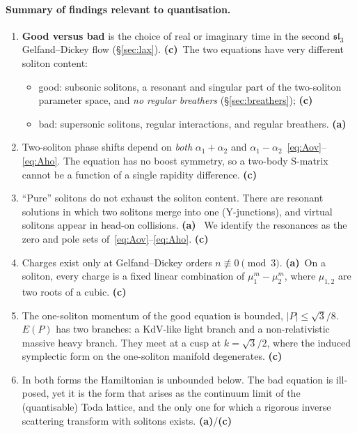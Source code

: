 \documentclass[11pt,a4paper]{article}
\newcommand{\La}{\textsf{\textbf{(a)}}}
\newcommand{\Lc}{\textsf{\textbf{(c)}}}
\theoremstyle{remark}
\begin{document}
\paragraph{Summary of findings relevant to quantisation.}
\begin{enumerate}
\item \textbf{Good versus bad} is the choice of real or imaginary time in the second $\mathfrak{sl}_3$ Gelfand--Dickey flow (\S\ref{sec:lax}). \Lc\ The two equations have very different soliton content:
  \begin{itemize}
  \item good: subsonic solitons, a resonant and singular part of the two-soliton parameter space, and \emph{no regular breathers} (\S\ref{sec:breathers}); \Lc
  \item bad: supersonic solitons, regular interactions, and regular breathers. \La~\cite{CL-SOL,BC}
  \end{itemize}
\item Two-soliton phase shifts depend on \emph{both} $\alpha_1+\alpha_2$ and $\alpha_1-\alpha_2$~\eqref{eq:Aov}--\eqref{eq:Aho}. The equation has no boost symmetry, so a two-body S-matrix cannot be a function of a single rapidity difference. \Lc
\item ``Pure'' solitons do not exhaust the soliton content. There are resonant solutions in which two solitons merge into one (Y-junctions), and virtual solitons appear in head-on collisions. \La~\cite{HI,LMK,RS,DMHC} We identify the resonances as the zero and pole sets of~\eqref{eq:Aov}--\eqref{eq:Aho}. \Lc
\item Charges exist only at Gelfand--Dickey orders $n\not\equiv0\pmod 3$. \La\ On a soliton, every charge is a fixed linear combination of $\mu_1^m-\mu_2^m$, where $\mu_{1,2}$ are two roots of a cubic. \Lc
\item The one-soliton momentum of the good equation is bounded, $|P|\le\sqrt3/8$. $E(P)$ has two branches: a KdV-like light branch and a non-relativistic massive heavy branch. They meet at a cusp at $k=\sqrt3/2$, where the induced symplectic form on the one-soliton manifold degenerates. \Lc
\item In both forms the Hamiltonian is unbounded below. The bad equation is ill-posed, yet it is the form that arises as the continuum limit of the (quantisable) Toda lattice, and the only one for which a rigorous inverse scattering transform with solitons exists. \La/\Lc
\end{enumerate}

\end{document}
